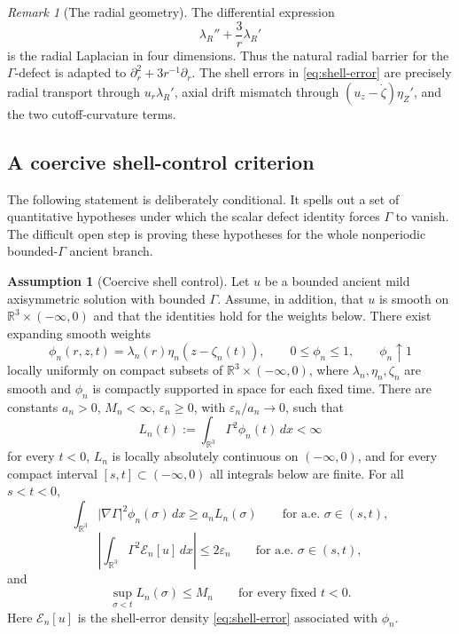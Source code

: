 \documentclass[11pt]{amsart}
\theoremstyle{plain}
\theoremstyle{definition}
\newtheorem{assumption}[theorem]{Assumption}
\theoremstyle{remark}
\newtheorem{remark}[theorem]{Remark}
\numberwithin{equation}{section}
\begin{document}
\begin{remark}[The radial geometry]
The differential expression
\[
   \lambda_R''+\frac3r\lambda_R'
\]
is the radial Laplacian in four dimensions.  Thus the natural radial barrier
for the \(\Gamma\)-defect is adapted to
\(\partial_r^2+3r^{-1}\partial_r\).  The shell errors in
\eqref{eq:shell-error} are precisely radial transport through
\(u_r\lambda_R'\), axial drift mismatch through
\((u_z-\dot\zeta)\eta_Z'\), and the two cutoff-curvature terms.
\end{remark}

\subsection{A coercive shell-control criterion}

The following statement is deliberately conditional.  It spells out a set of
quantitative hypotheses under which the scalar defect identity forces
\(\Gamma\) to vanish.  The difficult open step is proving these
hypotheses for the whole nonperiodic bounded-\(\Gamma\) ancient branch.

\begin{assumption}[Coercive shell control]\label{ass:shell-control}
Let \(u\) be a bounded ancient mild axisymmetric solution with bounded
\(\Gamma\).  Assume, in addition, that \(u\) is smooth on
\(\mathbb R^3\times(-\infty,0)\) and that the identities
 hold for the weights
below.  There exist expanding smooth weights
\[
   \phi_n(r,z,t)=\lambda_n(r)\eta_n(z-\zeta_n(t)),
   \qquad 0\le\phi_n\le1,\qquad \phi_n\uparrow1
\]
locally uniformly on compact subsets of
\(\mathbb R^3\times(-\infty,0)\), where \(\lambda_n,\eta_n,\zeta_n\) are
smooth and \(\phi_n\) is compactly supported in space for each fixed time.
There are constants \(a_n>0\), \(M_n<\infty\), \(\varepsilon_n\ge0\), with
\(\varepsilon_n/a_n\to0\), such that
\[
   L_n(t):=\int_{\mathbb R^3}\Gamma^2\phi_n(t)\,dx<\infty
\]
for every \(t<0\), \(L_n\) is locally absolutely continuous on
\((-\infty,0)\), and for every compact interval \([s,t]\subset(-\infty,0)\)
all integrals below are finite.  For all \(s<t<0\),
\begin{equation}\label{eq:shell-coercive}
   \int_{\mathbb R^3}|\nabla\Gamma|^2\phi_n(\sigma)\,dx
   \ge
   a_n L_n(\sigma)
   \qquad\text{for a.e. }\sigma\in(s,t),
\end{equation}
\begin{equation}\label{eq:shell-error-bound}
   \left|
   \int_{\mathbb R^3}\Gamma^2
   \mathcal E_n[u]\,dx
   \right|
   \le
   2\varepsilon_n
   \qquad\text{for a.e. }\sigma\in(s,t),
\end{equation}
and
\begin{equation}\label{eq:shell-past-bound}
   \sup_{\sigma<t}L_n(\sigma)\le M_n
   \qquad\text{for every fixed }t<0.
\end{equation}
Here \(\mathcal E_n[u]\) is the shell-error density
\eqref{eq:shell-error} associated with \(\phi_n\).
\end{assumption}
\end{document}
